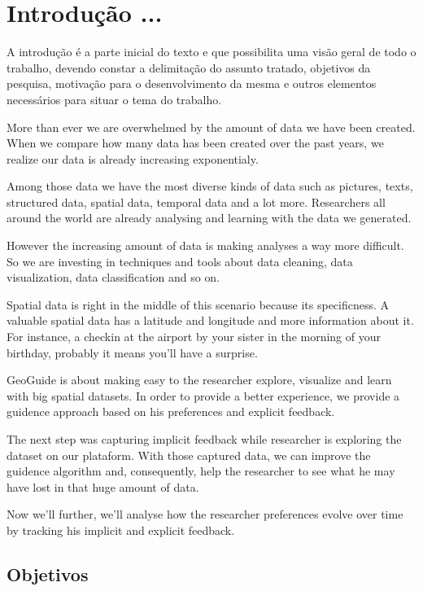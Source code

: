 \chapter{Introdução ...}
\label{chap:introducao}

A introdução é a parte inicial do texto e que possibilita uma visão geral de
todo o trabalho, devendo constar a delimitação do assunto tratado, objetivos da
pesquisa, motivação para o desenvolvimento da mesma e outros elementos
necessários para situar o tema do trabalho.


More than ever we are overwhelmed by the amount of data we have been
created. When we compare how many data has been created over the past years, we realize our data is already increasing exponentialy.

Among those data we have the most diverse kinds of data such as pictures, texts, structured data, spatial data, temporal data and a lot more. Researchers all around the world are already analysing and learning with the data we generated.

However the increasing amount of data is making analyses a way more difficult. So we are investing in techniques and tools about data cleaning, data visualization, data classification and so on.

Spatial data is right in the middle of this scenario because its specificness. A valuable spatial data has a latitude and longitude and more information about it. For instance, a checkin at the airport by your sister in the morning of your birthday, probably it means you'll have a surprise.

GeoGuide is about making easy to the researcher explore, visualize and learn with big spatial datasets. In order to provide a better experience, we provide a guidence approach based on his preferences and explicit feedback.

The next step was capturing implicit feedback while researcher is exploring the dataset on our plataform. With those captured data, we can improve the guidence algorithm and, consequently, help the researcher to see what he may have lost in that huge amount of data.

Now we'll further, we'll analyse how the researcher preferences evolve over time by tracking his implicit and explicit feedback.

\section{Objetivos}

